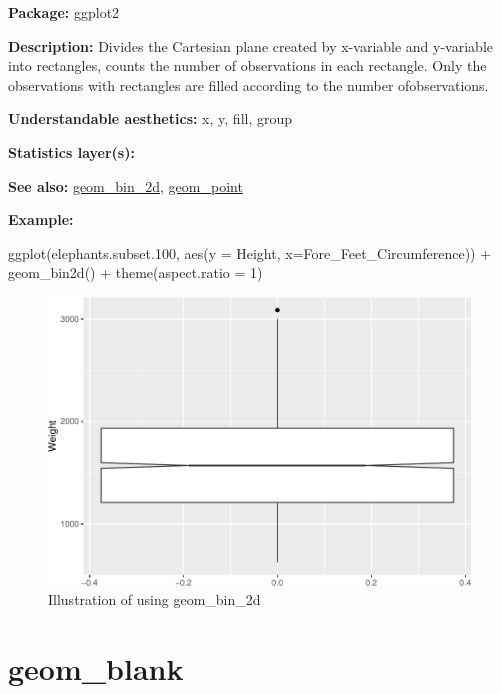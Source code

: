 \documentclass[
]{book}
\newenvironment{Shaded}{\begin{snugshade}}{\end{snugshade}}
\newcommand{\AttributeTok}[1]{\textcolor[rgb]{0.77,0.63,0.00}{#1}}
\newcommand{\DecValTok}[1]{\textcolor[rgb]{0.00,0.00,0.81}{#1}}
\newcommand{\FloatTok}[1]{\textcolor[rgb]{0.00,0.00,0.81}{#1}}
\newcommand{\FunctionTok}[1]{\textcolor[rgb]{0.00,0.00,0.00}{#1}}
\newcommand{\NormalTok}[1]{#1}
\newcommand{\SpecialCharTok}[1]{\textcolor[rgb]{0.00,0.00,0.00}{#1}}
\begin{document}
\textbf{Package: } ggplot2 \autocite{R-ggplot2}

\textbf{Description: } Divides the Cartesian plane created by x-variable and y-variable into rectangles, counts the number of observations in each rectangle. Only the observations with rectangles are filled according to the number ofobservations.

\textbf{Understandable aesthetics: } x, y, fill, group

\textbf{Statistics layer(s): }

\textbf{See also: } \protect\hyperlink{bin_2d}{geom\_bin\_2d}, \protect\hyperlink{point}{geom\_point}

\textbf{Example:}

\begin{Shaded}
\begin{Highlighting}[]
\FunctionTok{ggplot}\NormalTok{(elephants.subset}\FloatTok{.100}\NormalTok{, }\FunctionTok{aes}\NormalTok{(}\AttributeTok{y =}\NormalTok{ Height, }\AttributeTok{x=}\NormalTok{Fore\_Feet\_Circumference)) }\SpecialCharTok{+}
  \FunctionTok{geom\_bin2d}\NormalTok{() }\SpecialCharTok{+} 
  \FunctionTok{theme}\NormalTok{(}\AttributeTok{aspect.ratio =} \DecValTok{1}\NormalTok{)}
\end{Highlighting}
\end{Shaded}

\begin{figure}
\centering
\includegraphics{Data-Visualisation-geom-Encyclopedia_files/figure-latex/unnamed-chunk-27-1.pdf}
\caption{\label{fig:unnamed-chunk-27}Illustration of using geom\_bin\_2d}
\end{figure}

\hypertarget{geom_blank}{%
\section{geom\_blank}\label{geom_blank}}
\end{document}
